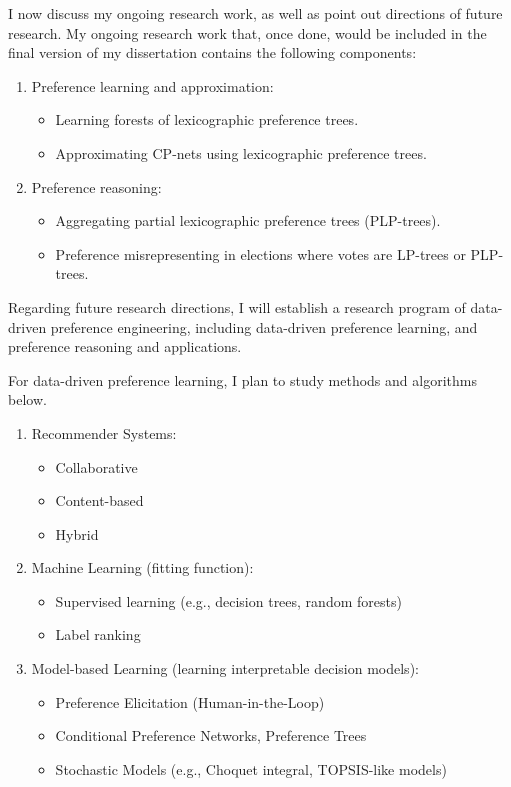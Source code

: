 I now discuss my ongoing research work, as well as point out directions of
future research.
My ongoing research work that, once done, would be included in 
the final version of my dissertation contains the following components:

\begin{enumerate}  \itemsep -4pt
	\item Preference learning and approximation:
		\begin{itemize} \itemsep -5pt
			\item Learning forests of lexicographic preference trees.
			\item Approximating CP-nets using lexicographic preference trees.
		\end{itemize}
	\item Preference reasoning:
		\begin{itemize} \itemsep -5pt
			\item Aggregating partial lexicographic preference trees (PLP-trees).
			\item Preference misrepresenting in elections where votes are LP-trees or PLP-trees.
		\end{itemize}
\end{enumerate}

Regarding future research directions, I will establish a research program of data-driven
preference engineering, including data-driven preference learning, and preference
reasoning and applications.

For data-driven preference learning, I plan to study methods and algorithms below.
\begin{enumerate}
	\item Recommender Systems\cite{adomavicius2005toward}:
		\begin{itemize}
			\item Collaborative
			\item Content-based
			\item Hybrid
		\end{itemize}
	\item Machine Learning (fitting function):
		\begin{itemize}
			\item Supervised learning (e.g., decision trees, random forests)
			\item Label ranking\cite{hullermeier2008label}
		\end{itemize}
	\item Model-based Learning (learning interpretable decision models):
		\begin{itemize}
			\item Preference Elicitation (Human-in-the-Loop)
			\item Conditional Preference Networks, Preference Trees
			\item Stochastic Models (e.g., Choquet integral\cite{tehrani2011choquistic}, 
						TOPSIS-like models\cite{agarwal2014preference})
		\end{itemize}
\end{enumerate}

